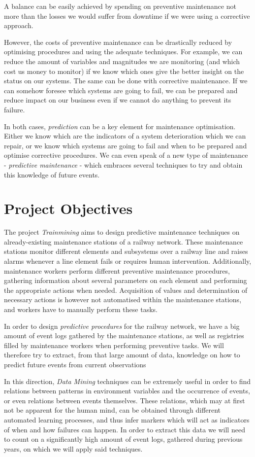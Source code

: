 A balance can be easily achieved by spending on preventive maintenance not more than the losses we would suffer from downtime if we were using a corrective approach.

However, the costs of preventive maintenance can be drastically reduced by optimising procedures and using the adequate techniques. For example, we can reduce the amount of variables and magnitudes we are monitoring (and which cost us money to monitor) if we know which ones give the better insight on the status on our systems. The same can be done with corrective maintenance. If we can somehow foresee which systems are going to fail, we can be prepared and reduce impact on our business even if we cannot do anything to prevent its failure.

In both cases, \emph{prediction} can be a key element for maintenance optimisation. Either we know which are the indicators of a system deterioration which we can repair, or we know which systems are going to fail and when to be prepared and optimise corrective procedures. We can even speak of a new type of maintenance - \emph{predictive maintenance} - which embraces several techniques to try and obtain this knowledge of future events.

\section{Project Objectives}
The project \emph{Trainmining} aims to design predictive maintenance techniques on already-existing maintenance stations of a railway network. These maintenance stations monitor different elements and subsystems over a railway line and raises alarms whenever a line element fails or requires human intervention. Additionally, maintenance workers perform different preventive maintenance procedures, gathering information about several parameters on each element and performing the appropriate actions when needed. Acquisition of values and determination of necessary actions is however not automatised within the maintenance stations, and workers have to manually perform these tasks.

In order to design \emph{predictive procedures} for the railway network, we have a big amount of event logs gathered by the maintenance stations, as well as registries filled by maintenance workers when performing preventive tasks. We will therefore try to extract, from that large amount of data, knowledge on how to predict future events from current observations

In this direction, \emph{Data Mining} techniques can be extremely useful in order to find relations between patterns in environment variables and the occurrence of events, or even relations between events themselves. These relations, which may at first not be apparent for the human mind, can be obtained through different automated learning processes, and thus infer markers which will act as indicators of when and how failures can happen. In order to extract this data we will need to count on a significantly high amount of event logs, gathered during previous years, on which we will apply said techniques.

